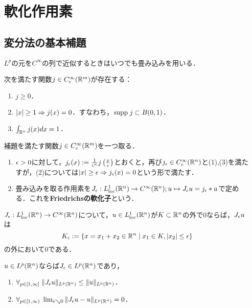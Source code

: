 \documentclass[uplatex,dvipdfmx]{jsreport}
\begin{document}
\section{軟化作用素}

\subsection{変分法の基本補題}

\begin{tcolorbox}[colframe=ForestGreen, colback=ForestGreen!10!white,breakable,colbacktitle=ForestGreen!40!white,coltitle=black,fonttitle=\bfseries\sffamily,
title=]
    $L^p$の元を$C^\infty$の列で近似するときはいつでも畳み込みを用いる．
\end{tcolorbox}

\begin{lemma}
    次を満たす関数$j\in C^\infty_c(\mathbb{R}^m)$が存在する：
    \begin{enumerate}
        \item $j\ge0$．
        \item $\lvert x\rvert\ge1\Rightarrow j(x)=0$．すなわち，$\mathrm{supp}\; j\subset B(0,1)$．
        \item $\int_{\mathbb{R}^n}j(x)dx=1$．
    \end{enumerate}
\end{lemma}

\begin{definition}[mollifier]
    補題を満たす関数$j\in C^\infty_c(\mathbb{R}^m)$を一つ取る．
    \begin{enumerate}
        \item $\epsilon>0$に対して，$j_\epsilon(x):=\frac{1}{\epsilon^n}j\left(\frac{x}{\epsilon}\right)$とおくと，再び$j_\epsilon\in C_c^\infty(\mathbb{R}^n)$と(1),(3)を満たすが，(2)については$\lvert x\rvert\ge\epsilon\Rightarrow j_\epsilon(x)=0$という形で満たす．
        \item 畳み込みを取る作用素を$J_\epsilon:L^1_{\mathrm{loc}}(\mathbb{R}^n)\to C^\infty(\mathbb{R}^n);u\mapsto J_\epsilon u=j_\epsilon*u$で定める．これを\textbf{Friedrichsの軟化子}という．
    \end{enumerate}
\end{definition}
\begin{lemma}
    $J_\epsilon:L^1_{\mathrm{loc}}(\mathbb{R}^n)\to C^\infty(\mathbb{R}^n)$について，$u\in L^1_{\mathrm{loc}}(\mathbb{R}^n)$が$K\subset\mathbb{R}^n$の外で$0$ならば，$J_\epsilon u$は
    \[K_\epsilon:=\left\{x=x_1+x_2\in\mathbb{R}^n\mid x_1\in K,\lvert x_2\rvert\le\epsilon\right\}\]
    の外において$0$である．
\end{lemma}

\begin{lemma}
    $u\in L^p(\mathbb{R}^n)$ならば$J_\epsilon\in L^p(\mathbb{R}^n)$であり，
    \begin{enumerate}
        \item $\forall_{p\in[1,\infty]}\;\|J_\epsilon u\|_{L^p(\mathbb{R}^n)}\le\|u\|_{L^p(\mathbb{R}^n)}$．
        \item $\forall_{p\in[1,\infty)}\;\lim_{\epsilon\searrow0}\|J_\epsilon u-u\|_{L^p(\mathbb{R}^n)}=0$．
    \end{enumerate}
\end{lemma}
\end{document}
